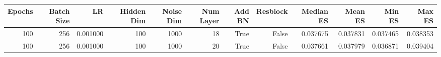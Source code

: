 \begin{tabular}{rrrrrrrrrrrr}
\toprule
Epochs & Batch Size & LR & Hidden Dim & Noise Dim & Num Layer & Add BN & Resblock & Median ES & Mean ES & Min ES & Max ES \\
\midrule
100 & 256 & 0.001000 & 100 & 1000 & 18 & True & False & 0.037675 & 0.037831 & 0.037465 & 0.038353 \\
100 & 256 & 0.001000 & 100 & 1000 & 20 & True & False & 0.037661 & 0.037979 & 0.036871 & 0.039404 \\
\bottomrule
\end{tabular}
